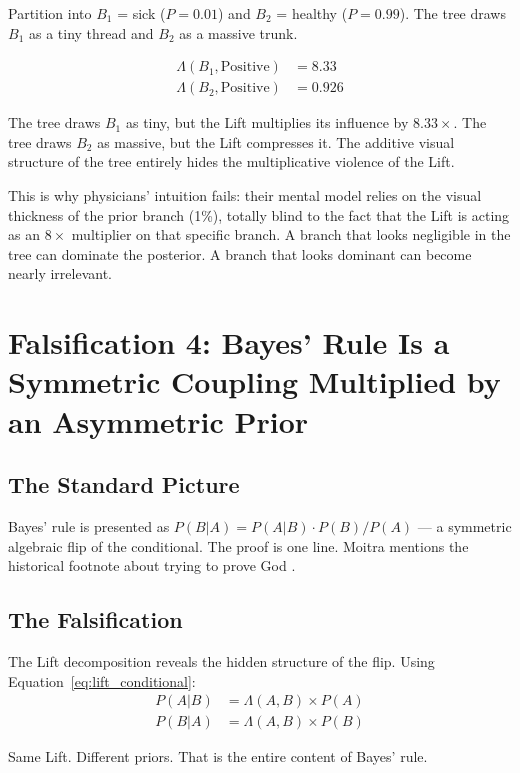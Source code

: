 \documentclass[12pt]{article}
\begin{document}
Partition into $B_1$ = sick ($P = 0.01$) and $B_2$ = healthy ($P = 0.99$). The tree draws $B_1$ as a tiny thread and $B_2$ as a massive trunk.

\begin{align}
\Lambda(B_1, \text{Positive}) &= 8.33 \\
\Lambda(B_2, \text{Positive}) &= 0.926
\end{align}

The tree draws $B_1$ as tiny, but the Lift multiplies its influence by $8.33\times$. The tree draws $B_2$ as massive, but the Lift compresses it. The additive visual structure of the tree entirely hides the multiplicative violence of the Lift.

This is why physicians' intuition fails: their mental model relies on the visual thickness of the prior branch (1\%), totally blind to the fact that the Lift is acting as an $8\times$ multiplier on that specific branch. A branch that looks negligible in the tree can dominate the posterior. A branch that looks dominant can become nearly irrelevant.

\section{Falsification 4: Bayes' Rule Is a Symmetric Coupling Multiplied by an Asymmetric Prior}

\subsection{The Standard Picture}

Bayes' rule is presented as $P(B|A) = P(A|B) \cdot P(B) / P(A)$ --- a symmetric algebraic flip of the conditional. The proof is one line. Moitra mentions the historical footnote about trying to prove God \cite{moitra2024}.

\subsection{The Falsification}

The Lift decomposition reveals the hidden structure of the flip. Using Equation~\ref{eq:lift_conditional}:
\begin{align}
P(A|B) &= \Lambda(A,B) \times P(A) \\
P(B|A) &= \Lambda(A,B) \times P(B)
\end{align}

Same Lift. Different priors. That is the entire content of Bayes' rule.
\end{document}
